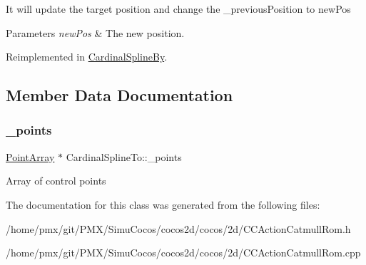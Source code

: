 It will update the target position and change the \+\_\+previous\+Position to new\+Pos


\begin{DoxyParams}{Parameters}
{\em new\+Pos} & The new position. \\
\hline
\end{DoxyParams}


Reimplemented in \hyperlink{classCardinalSplineBy_ac28d6a528e8d265913b07d74a700cca9}{Cardinal\+Spline\+By}.



\subsection{Member Data Documentation}
\mbox{\label{classCardinalSplineTo_a3ef76fd17e6ad9641c4f6aa27b5d6ec9}} 
\subsubsection{\texorpdfstring{\+\_\+points}{\_points}}
{\footnotesize\ttfamily \hyperlink{classPointArray}{Point\+Array} $\ast$ Cardinal\+Spline\+To\+::\+\_\+points\hspace{0.3cm}{\ttfamily [protected]}}

Array of control points 

The documentation for this class was generated from the following files\+:\begin{DoxyCompactItemize}
\item 
/home/pmx/git/\+P\+M\+X/\+Simu\+Cocos/cocos2d/cocos/2d/C\+C\+Action\+Catmull\+Rom.\+h\item 
/home/pmx/git/\+P\+M\+X/\+Simu\+Cocos/cocos2d/cocos/2d/C\+C\+Action\+Catmull\+Rom.\+cpp\end{DoxyCompactItemize}
